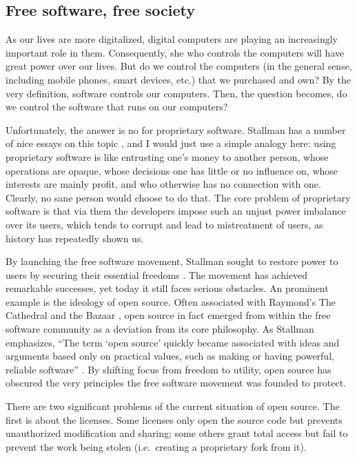 \documentclass[10pt]{article}
\begin{document}
\subsection[Free software, free society]{
Free software, free society\protect\footnotemark}

As our lives are more digitalized, digital computers are playing an
increasingly important role in them. Consequently, she who controls the
computers will have great power over our lives. But do we control the computers
(in the general sense, including mobile phones, smart devices, etc.) that we
purchased and own? By the very definition, software controls our computers.
Then, the question becomes, do we control the software that runs on our
computers?

Unfortunately, the answer is no for proprietary software. Stallman
has a number of nice essays on this topic \cite{stallman.essays}, and I would
just use a simple analogy here: using proprietary software is like entrusting
one's money to another person, whose operations are opaque, whose decisions one
has little or no influence on, whose interests are mainly profit, and who
otherwise has no connection with one. Clearly, no sane person would choose to
do that.  The core problem of proprietary software is that via them the
developers impose such an unjust power imbalance over its users, which tends to
corrupt and lead to mistreatment of users, as history has repeatedly shown us.

By launching the free software movement, Stallman sought to restore power to
users by securing their essential freedoms \cite[Essay~1]{stallman.essays}. The
movement has achieved remarkable successes, yet today it still faces serious
obstacles. An prominent example is the ideology of open source. Often
associated with Raymond’s The Cathedral and the Bazaar \cite{cathedral.bazaar},
open source in fact emerged from within the free software community as a
deviation from its core philosophy. As Stallman emphasizes, ``The term `open
source' quickly became associated with ideas and arguments based only on
practical values, such as making or having powerful, reliable software''
\cite[Essay~14]{stallman.essays}. By shifting focus from freedom to utility,
open source has obscured the very principles the free software movement was
founded to protect.

There are two significant problems of the current situation of open source. The
first is about the licenses. Some licenses only open the source code but
prevents unauthorized modification and sharing; some others grant total
access but fail to prevent the work being stolen (i.e.\ creating a proprietary
fork from it). 
\end{document}
